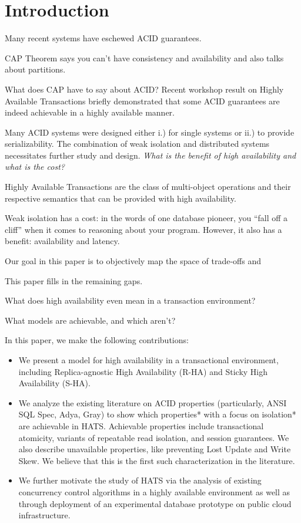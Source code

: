 

\section{Introduction}

Many recent systems have eschewed ACID guarantees.

CAP Theorem says you can't have consistency and availability and also talks about partitions.

What does CAP have to say about ACID? Recent workshop result on Highly Available Transactions briefly demonstrated that some ACID guarantees are indeed achievable in a highly available manner.

Many ACID systems were designed either i.) for single systems or ii.)
to provide serializability. The combination of weak isolation and
distributed systems necessitates further study and
design. \textit{What is the benefit of high availability and what is
  the cost?}

Highly Available Transactions are the class of multi-object operations
and their respective semantics that can be provided with high
availability.

Weak isolation has a cost: in the words of one database pioneer, you
``fall off a cliff'' when it comes to reasoning about your
program. However, it also has a benefit: availability and latency.

Our goal in this paper is to objectively map the space of trade-offs and 

 This paper fills in the remaining gaps.

What does high availability even mean in a transaction environment?

What models are achievable, and which aren't?

In this paper, we make the following contributions:

\begin{itemize}
\item We present a model for high availability in a transactional environment, including Replica-agnostic High Availability (R-HA) and Sticky High Availability (S-HA).
\item We analyze the existing literature on ACID properties (particularly, ANSI SQL Spec, Adya, Gray) to show which properties* with a focus on isolation* are achievable in HATS. Achievable properties include transactional atomicity, variants of repeatable read isolation, and session guarantees. We also describe unavailable properties, like preventing Lost Update and Write Skew. We believe that this is the first such characterization in the literature.
\item We further motivate the study of HATS via the analysis of existing concurrency control algorithms in a highly available environment as well as through deployment of an experimental database prototype on public cloud infrastructure.
\end{itemize}


